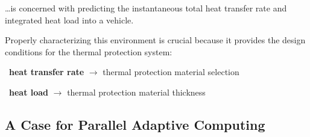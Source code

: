 \documentclass[compress,11pt]{beamer}
\begin{document}
{  \ldots is concerned with predicting the instantaneous total heat transfer rate and integrated heat load into a vehicle.
  \vspace{1em}

  Properly characterizing this environment is crucial because it provides the design conditions for the thermal protection system:
  \vspace{1em}
  
  \mbox{  }\textbf{heat transfer rate} $\rightarrow$ thermal protection material selection
  
  \mbox{  }\textbf{heat load} $\rightarrow$ thermal protection material thickness
}

\subsection{A Case for Parallel Adaptive Computing}
\frame
\end{document}
